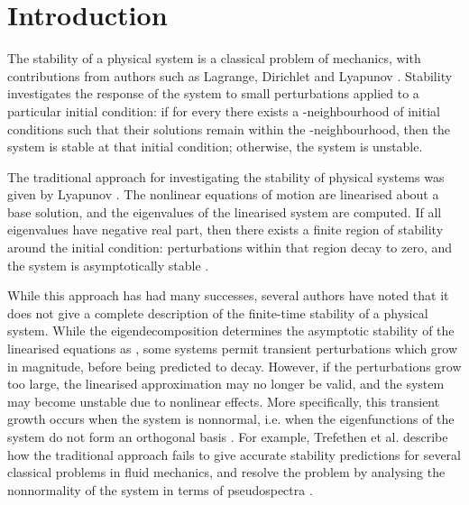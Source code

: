 \documentclass{siamltex}
\begin{document}
  \pagestyle{myheadings}
  \thispagestyle{plain}

  \setcounter{section}{0}
  \setcounter{equation}{0}

\section{Introduction}

The stability of a physical system is a classical problem
of mechanics, with contributions from authors such as Lagrange,
Dirichlet and Lyapunov \cite{leine2010}. Stability investigates 
the response of the system to small perturbations
applied to a particular initial condition: if for every  there exists a -neighbourhood of initial conditions
such that their solutions remain within the -neighbourhood, then the system is stable at that initial condition; otherwise,
the system is unstable.

The traditional approach for investigating the stability of physical
systems was given by Lyapunov \cite{lyapunov1892}. The nonlinear
equations of motion are linearised about a base solution, and the eigenvalues
of the linearised system are computed. If all eigenvalues have negative real
part, then there exists a finite region of stability around the initial condition:
perturbations within that region decay to zero, and the system is asymptotically
stable \cite{parks1992}.

While this approach has had many successes, several authors have noted that
it does not give a complete description of the finite-time stability of a physical
system. While the eigendecomposition determines the asymptotic stability of the linearised equations as
, some systems permit transient perturbations which
grow in magnitude, before being predicted to decay. However, if the perturbations
grow too large, the linearised approximation may no longer be valid, and the system may become
unstable due to nonlinear effects. More specifically, this transient growth occurs when the system is nonnormal,
i.e. when the eigenfunctions of the system do not form an orthogonal basis \cite{schmid2007}.
For example, Trefethen et al. \cite{trefethen1993} describe how
the traditional approach fails to give accurate stability predictions
for several classical problems in fluid mechanics, and resolve the problem
by analysing the nonnormality of the system in terms of pseudospectra \cite{trefethen2006}.
\end{document}
